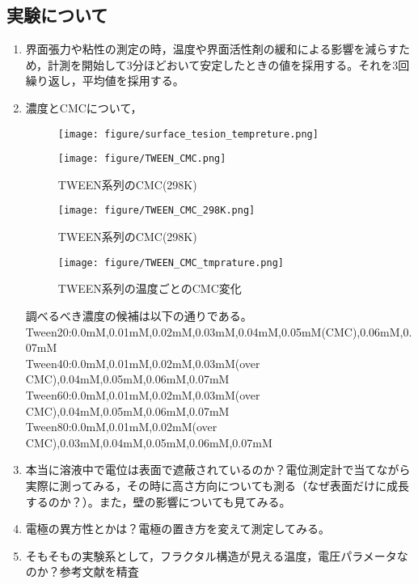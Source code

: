 \documentclass{ltjsarticle}
\begin{document}
\subsection{実験について}
\begin{enumerate}
  \item 界面張力や粘性の測定の時，温度や界面活性剤の緩和による影響を減らすため，計測を開始して3分ほどおいて安定したときの値を採用する。それを3回繰り返し，平均値を採用する。
  \item 濃度とCMCについて，
        \begin{figure}[H]
          \begin{minipage}[H]{0.49\columnwidth}
            \centering
            \texttt{[image: figure/surface\_tesion\_tempreture.png]}
            \caption{TWEEN系列の界面張力の濃度依存性(30\si{\degreeCelsius})\cite{kothekar2007comparative}}
            \label{fig:界面張力の濃度依存性}
          \end{minipage}
          \begin{minipage}[H]{0.49\columnwidth}
            \centering
            \texttt{[image: figure/TWEEN\_CMC.png]}
            \caption{TWEEN系列のCMC(298\si{\kelvin})\cite{hait2001determination}}
            \label{fig:TWEENのCMC}
          \end{minipage}
        \end{figure}
        \begin{figure}[H]
          \centering
          \texttt{[image: figure/TWEEN\_CMC\_298K.png]}
          \caption{TWEEN系列のCMC(298\si{\kelvin})\cite{hait2001determination}}
          \label{fig:TWEENのCMC2}
        \end{figure}
        \begin{figure}
          \centering
          \texttt{[image: figure/TWEEN\_CMC\_tmprature.png]}
          \caption{TWEEN系列の温度ごとのCMC変化\cite{mahmood2013effect}}
          \label{fig:TWEENのCMCの温度変化}
        \end{figure}
        調べるべき濃度の候補は以下の通りである。\\
        Tween20:0.0mM,0.01mM,0.02mM,0.03mM,0.04mM,0.05mM(CMC),0.06mM,0.07mM\\
        Tween40:0.0mM,0.01mM,0.02mM,0.03mM(over CMC),0.04mM,0.05mM,0.06mM,0.07mM\\
        Tween60:0.0mM,0.01mM,0.02mM,0.03mM(over CMC),0.04mM,0.05mM,0.06mM,0.07mM\\
        Tween80:0.0mM,0.01mM,0.02mM(over CMC),0.03mM,0.04mM,0.05mM,0.06mM,0.07mM\\
  \item {\color{red}本当に溶液中で電位は表面で遮蔽されているのか？}\rightarrow 電位測定計で当てながら実際に測ってみる，その時に高さ方向についても測る（なぜ表面だけに成長するのか？）。また，壁の影響についても見てみる。
  \item 電極の異方性とかは？\rightarrow 電極の置き方を変えて測定してみる。
  \item {\color{red}そもそもの実験系として，フラクタル構造が見える温度，電圧パラメータなのか？\rightarrow 参考文献を精査}
\end{enumerate}
\end{document}
